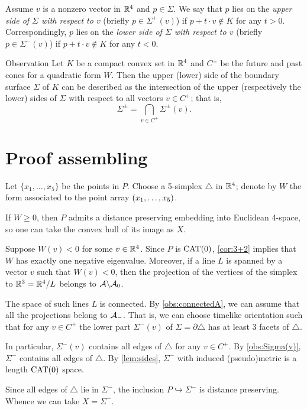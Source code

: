 \documentclass{article}
\begin{document}
Assume $v$ is a nonzero vector in $\mathbb{R}^4$ and $p\in\Sigma$.
We say that $p$ lies on the \emph{upper side of $\Sigma$ with respect to $v$} (briefly $p\in \Sigma^+(v)$) if $p+t\cdot v\notin K$ for any $t>0$.
Correspondingly, $p$ lies on the \emph{lower side of $\Sigma$ with respect to $v$} (briefly $p\in \Sigma^-(v)$) if $p+t\cdot v\notin K$ for any $t<0$.

\begin{thm}{Observation}\label{obs:Sigma(v)}
Let $K$ be a compact convex set in $\mathbb{R}^4$ and $C^\pm$ be the future and past cones for a quadratic form $W$.
Then the upper (lower) side of the boundary surface $\Sigma$ of $K$ can be described as the intersection of the upper (respectively the lower) sides of $\Sigma$ with respect to all vectors $v\in C^+$;
that is,
\[\Sigma^\pm=\bigcap_{v\in C^+}\Sigma^\pm(v).\]
\end{thm}

\section{Proof assembling}

Let $\{x_1,\dots,x_5\}$ be the points in $P$.
Choose a 5-simplex $\triangle$ in $\mathbb{R}^4$; denote by $W$ the form associated to the point array $(x_1,\z\dots,x_5)$.

If $W\ge0$, then $P$ admits a distance preserving embedding into Euclidean 4-space, so one can take the convex hull of its image as $X$.

Suppose $W(v)<0$ for some $v\in\mathbb{R}^4$.
Since $P$ is $\mathrm{CAT}(0)$, \ref{cor:3+2} implies that $W$ has exactly one negative eigenvalue.
Moreover, if a line $L$ is spanned by a vector $v$ such that $W(v)<0$, then the projection of the vertices of the simplex to $\mathbb{R}^3=\mathbb{R}^4/L$ belongs to $\mathcal{A}\backslash\mathcal{A}_0$.

The space of such lines $L$ is connected.
By \ref{obs:connectedA}, we can assume that all the projections belong to $\mathcal{A}_-$.
That is, we can choose timelike orientation such that for any $v\in C^+$ the lower part $\Sigma^-(v)$ of $\Sigma=\partial \triangle$ has at least 3 facets of $\triangle$.

In particular, $\Sigma^-(v)$ contains all edges of $\triangle$ for any $v\in C^+$.
By \ref{obs:Sigma(v)}, $\Sigma^-$ contains all edges of $\triangle$.
By \ref{lem:sides}, $\Sigma^-$ with induced (pseudo)metric is a length $\mathrm{CAT}(0)$ space.

Since all edges of $\triangle$ lie in $\Sigma^-$, the inclusion $P\hookrightarrow \Sigma^-$ is distance preserving.
Whence we can take $X=\Sigma^-$.
\end{document}
